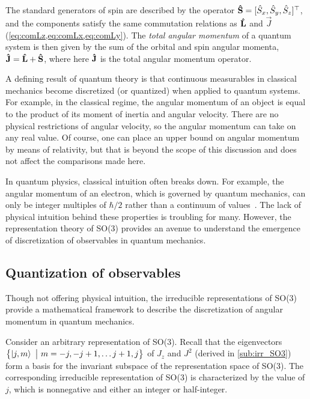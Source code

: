 The standard generators of spin are described by the operator $\mathbf{\hat{S}} = [\hat{S}_x,\hat{S}_y,\hat{S}_z]^\top$, and the components satisfy the same commutation relations as $\mathbf{\hat{L}}$ and $\vec{J}$ (\cref{eq:comLz,eq:comLx,eq:comLy}). The \textit{total angular momentum} of a quantum system is then given by the sum of the orbital and spin angular momenta, $\mathbf{\hat{J}} = \mathbf{\hat{L}} + \mathbf{\hat{S}}$, where here $\mathbf{\hat{J}}$ is the total angular momentum operator.

A defining result of quantum theory is that continuous measurables in classical mechanics become discretized (or quantized) when applied to quantum systems. For example, in the classical regime, the angular momentum of an object is equal to the product of its moment of inertia and angular velocity. There are no physical restrictions of angular velocity, so the angular momentum can take on any real value. Of course, one can place an upper bound on angular momentum by means of relativity, but that is beyond the scope of this discussion and does not affect the comparisons made here.


In quantum physics, classical intuition often breaks down. For example, the angular momentum of an electron, which is governed by quantum mechanics, can only be integer multiples of $\hbar/2$ rather than a continuum of values~\cite{Griffiths2018,Hall2013}. The lack of physical intuition behind these properties is troubling for many. However, the representation theory of SO(3) provides an avenue to understand the emergence of discretization of observables in quantum mechanics.

\subsection{Quantization of observables}
Though not offering physical intuition, the irreducible representations of SO(3) provide a mathematical framework to describe the discretization of angular momentum in quantum mechanics.

\sloppy Consider an arbitrary representation of SO(3). Recall that the eigenvectors $\left\{ \ket{j,m}~\big|~ m=-j,-j+1,\dots j+1,j \right\}$ of $J_z$ and $J^2$ (derived in \cref{sub:irr_SO3}) form a basis for the invariant subspace of the representation space of SO(3). The corresponding irreducible representation of SO(3) is characterized by the value of $j$, which is nonnegative and either an integer or half-integer.

